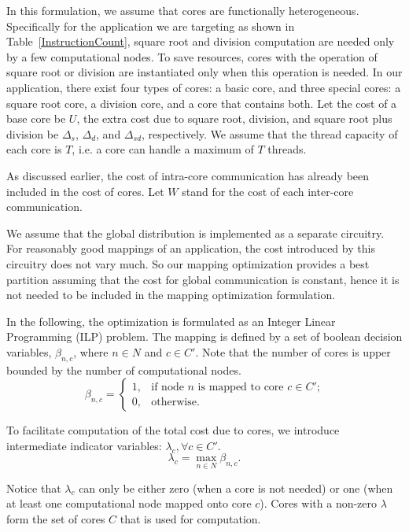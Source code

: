 In this formulation, we assume that cores are functionally heterogeneous. 
Specifically for the application we are targeting as shown in Table~\ref{InstructionCount}, square root and division computation are needed only by a few computational nodes. 
To save resources, cores with the operation of square root or division are instantiated only when this operation is needed. 
In our application, there exist four types of cores: a basic core, and three special cores: a square root core, a division core, and a core that contains both. 
Let the cost of a base core be $U$, the extra cost due to square root, division, and square root plus division be $\Delta_s$, $\Delta_d$, and $\Delta_{sd}$, respectively. 
We assume that the thread capacity of each core is $T$, i.e. a core can handle a maximum of $T$ threads. 

As discussed earlier, the cost of intra-core communication has already been included in the cost of cores. 
Let $W$ stand for the cost of each inter-core communication. 

We assume that the global distribution is implemented as a separate circuitry. 
For reasonably good mappings of an application, the cost introduced by this circuitry does not vary much. 
So our mapping optimization provides a best partition assuming that the cost for global communication is constant, hence it is not needed to be included in the mapping optimization formulation. 

In the following, the optimization is formulated as an Integer Linear Programming (ILP) problem.
The mapping is defined by a set of boolean decision variables, $\beta_{n,c}$, where $n \in N$ and $c\in C'$.
 Note that the number of cores is upper bounded by the number of computational nodes. 
%
\begin{equation} \label{eq:primary_decision_var}
\beta_{n,c}=
\begin{cases}
1, &\text{if node $n$ is mapped to core $c \in C'$;}\\
0, &\text{otherwise.}
\end{cases}
\end{equation}

To facilitate computation of the total cost due to cores, we introduce intermediate indicator variables: $\lambda_c, \forall c \in C'$.
%
\begin{equation}\label{eq:intermediate_var_core_used}
\lambda_c = \max_{n \in N}\beta_{n,c}. 
\end{equation}

\noindent Notice that $\lambda_c$ can only be either zero (when a core is not needed) or one (when at least one computational node mapped onto core $c$). Cores with a non-zero $\lambda$ form the set of cores $C$ that is used for computation.

